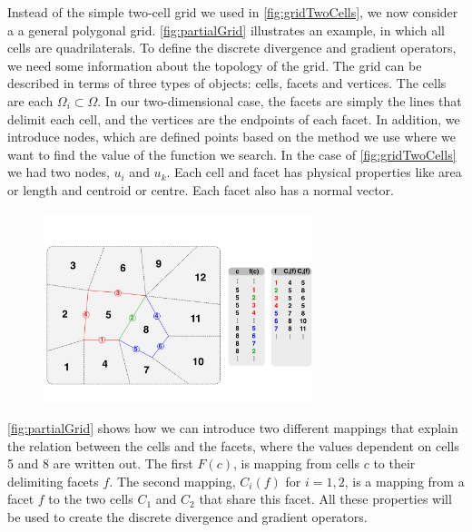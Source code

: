 Instead of the simple two-cell grid we used in \autoref{fig:gridTwoCells}, we now consider a a general polygonal grid. \autoref{fig:partialGrid} illustrates an example, in which all cells are quadrilaterals. To define the discrete divergence and gradient operators, we need some information about the topology of the grid. The grid can be described in terms of three types of objects: cells, facets and vertices. The cells are each $\Omega_i \subset \Omega$. In our two-dimensional case, the facets are simply the lines that delimit each cell, and the vertices are the endpoints of each facet. In addition, we introduce nodes, which are defined points based on the method we use where we want to find the value of the function we search. In the case of \autoref{fig:gridTwoCells} we had two nodes, $u_i$ and $u_k$. Each cell and facet has physical properties like area or length and centroid or centre. Each facet also has a normal vector. 
\begin{figure}[htb]
    \centering
    \includegraphics[width = 0.7\textwidth]{figures/grid_cells_facets.pdf}
    \caption{}
    \label{fig:partialGrid}
\end{figure}

\autoref{fig:partialGrid} shows how we can introduce two different mappings that explain the relation between the cells and the facets, where the values dependent on cells 5 and 8 are written out. The first $F(c)$, is mapping from cells $c$ to their delimiting facets $f$. The second mapping, $C_i(f)$ for $i = 1,2$, is a mapping from a facet $f$ to the two cells $C_1$ and $C_2$ that share this facet. All these properties will be used to create the discrete divergence and gradient operators.

